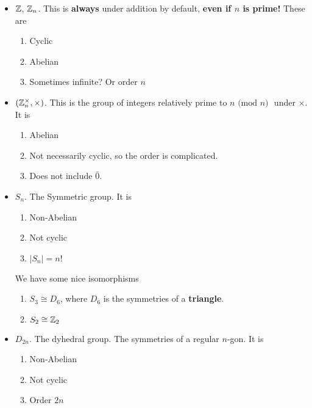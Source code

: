 \documentclass[12pt]{article}
\renewcommand{\mod}[1]{
  \text{ (mod $#1$) }
}
\begin{document}
\begin{itemize}
  \item ${\mathbb Z}$, ${\mathbb Z}_n$. This is {\bf always} under addition by default, {\bf even
    if $n$ is prime!} These are

    \begin{enumerate}
      \item Cyclic
      \item Abelian
      \item Sometimes infinite? Or order $n$
    \end{enumerate}


  \item $({\mathbb Z}_n^\times, \times)$. This is the group of integers relatively prime
    to $n \mod n$ under $\times$. It is

    \begin{enumerate}
      \item Abelian
      \item Not necessarily cyclic, so the order is complicated.
      \item Does not include $\bar 0$.
    \end{enumerate}

  \item $S_n$. The Symmetric group. It is

    \begin{enumerate}
      \item Non-Abelian
      \item Not cyclic
      \item $|S_n| = n!$
    \end{enumerate}

    We have some nice isomorphisms

    \begin{enumerate}
      \item $S_3 \cong D_6$, where $D_6$ is the symmetries of a {\bf triangle}.
      \item $S_2 \cong {\mathbb Z}_2$
    \end{enumerate}

  \item $D_{2n}$. The dyhedral group. The symmetries of a regular $n$-gon. It is

    \begin{enumerate}
      \item Non-Abelian
      \item Not cyclic
      \item Order $2n$
    \end{enumerate}


\end{itemize}
\end{document}
